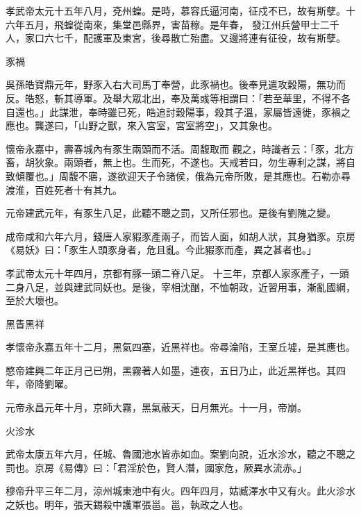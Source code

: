 \begin{pinyinscope}
 孝武帝太元十五年八月，兗州蝗。是時，慕容氏逼河南，征戍不已，故有斯孽。十六年五月，飛蝗從南來，集堂邑縣界，害苗稼。是年春，
 發江州兵營甲士二千人，家口六七千，配護軍及東宮，後尋散亡殆盡。又邊將連有征役，故有斯孽。



 豕禍



 吳孫皓寶鼎元年，野豕入右大司馬丁奉營，此豕禍也。後奉見遣攻穀陽，無功而反。皓怒，斬其導軍。及舉大眾北出，奉及萬彧等相謂曰：「若至華里，不得不各自還也。」此謀泄，奉時雖已死，皓追討穀陽事，殺其子溫，家屬皆遠徙，豕禍之應也。龔遂曰，「山野之獸，來入宮室，宮室將空」，又其象也。



 懷帝永嘉中，壽春城內有豕生兩頭而不活。周馥取而
 觀之，時識者云：「豕，北方畜，胡狄象。兩頭者，無上也。生而死，不遂也。天戒若曰，勿生專利之謀，將自致傾覆也。」周馥不寤，遂欲迎天子令諸侯，俄為元帝所敗，是其應也。石勒亦尋渡淮，百姓死者十有其九。



 元帝建武元年，有豕生八足，此聽不聰之罰，又所任邪也。是後有劉隗之變。



 成帝咸和六年六月，錢唐人家豭豕產兩子，而皆人面，如胡人狀，其身猶豕。京房《易妖》曰：「豕生人頭豕身者，危且亂。今此豭豕而產，異之甚者也。」



 孝武帝太元十年四月，京都有豚一頭二脊八足。
 十三年，京都人家豕產子，一頭二身八足，並與建武同妖也。是後，宰相沈酗，不恤朝政，近習用事，漸亂國綱，至於大壞也。



 黑眚黑祥



 孝懷帝永嘉五年十二月，黑氣四塞，近黑祥也。帝尋淪陷，王室丘墟，是其應也。



 愍帝建興二年正月己已朔，黑霧著人如墨，連夜，五日乃止，此近黑祥也。其四年，帝降劉曜。



 元帝永昌元年十月，京師大霧，黑氣蔽天，日月無光。十一月，帝崩。



 火沴水



 武帝太康五年六月，任城、魯國池水皆赤如血。案劉向說，近水沴水，聽之不聰之罰也。京房《易傳》曰：「君淫於色，賢人潛，國家危，厥異水流赤。」



 穆帝升平三年二月，涼州城東池中有火。四年四月，姑臧澤水中又有火。此火沴水之妖也。明年，張天錫殺中護軍張邕。邕，執政之人也。




\end{pinyinscope}
